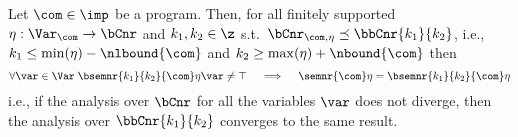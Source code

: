 

\begin{theorem}
  Let \(\com\in\imp\) be a program. Then, for all finitely supported
  \(\eta : \Var_{\com} \to \bCnr\) and \(k_1, k_2 \in \z\) s.t.\
  \(\bCnr_{\com,\eta} \preceq \bbCnr{k_1}{k_2}\), i.e.,
  \(k_1 \leq \min(\eta) - \nlbound{\com}\) and
  \(k_2 \geq \max(\eta) + \nbound{\com}\) then
  \begin{equation*}
    \forall \var\in\Var \; \bsemnr{k_1}{k_2}{\com}\eta\var \neq \top
    \quad
    \implies
    \quad
    \semnr{\com}\eta = \bsemnr{k_1}{k_2}{\com}\eta
  \end{equation*}
  i.e., if the analysis over \(\bCnr\) for all the variables \(\var\)
  does not diverge, then the analysis over \(\bbCnr{k_1}{k_2}\)
  converges to the same result.
\end{theorem}

